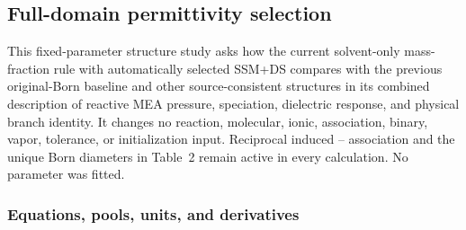 \documentclass[10pt,oneside]{scrartcl}
\begin{document}
\subsection{Full-domain permittivity selection}
\label{sec:permittivity-comparison}

This fixed-parameter structure study asks how the current solvent-only
mass-fraction rule with automatically selected SSM+DS compares with the
previous original-Born baseline and other source-consistent structures in its
combined description of reactive MEA pressure, speciation, dielectric
response, and physical branch identity. It changes no
reaction, molecular, ionic, association, binary, vapor, tolerance, or
initialization input. Reciprocal induced -- association and
the unique Born diameters in Table~2 remain active in every calculation. No
parameter was fitted.

\subsubsection{Equations, pools, units, and derivatives}
\end{document}
